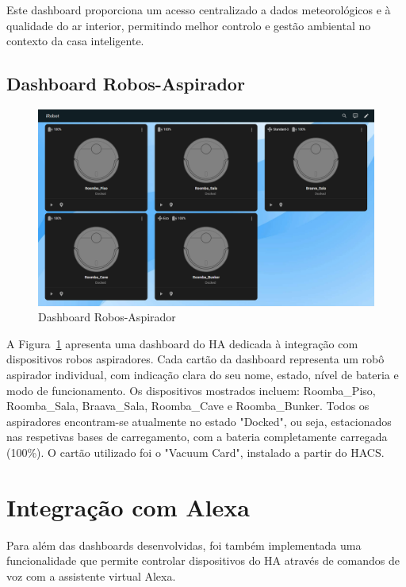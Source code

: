 Este dashboard proporciona um acesso centralizado a dados meteorológicos e à qualidade do ar interior, permitindo melhor controlo e gestão ambiental no contexto da casa inteligente.


\subsection{Dashboard Robos-Aspirador}

\begin{figure}[H]
    \centering
    \includegraphics[width=\textwidth]{images/irobot.png}
    \caption{Dashboard Robos-Aspirador}
    \label{fig: irobot.png}
\end{figure}

A Figura~\ref{fig: irobot.png} apresenta uma dashboard do \gls{HA} dedicada à integração com dispositivos robos aspiradores. Cada cartão da dashboard representa um robô aspirador individual, com indicação clara do seu nome, estado, nível de bateria e modo de funcionamento. Os dispositivos mostrados incluem: Roomba\_Piso, Roomba\_Sala, Braava\_Sala, Roomba\_Cave e Roomba\_Bunker. Todos os aspiradores encontram-se atualmente no estado "Docked", ou seja, estacionados nas respetivas bases de carregamento, com a bateria completamente carregada (100\%). O cartão utilizado foi o "Vacuum Card", instalado a partir do \gls{HACS}.\\

\section{Integração com Alexa}

Para além das dashboards desenvolvidas, foi também implementada uma funcionalidade que permite controlar dispositivos do \gls{HA} através de comandos de voz com a assistente virtual Alexa.

